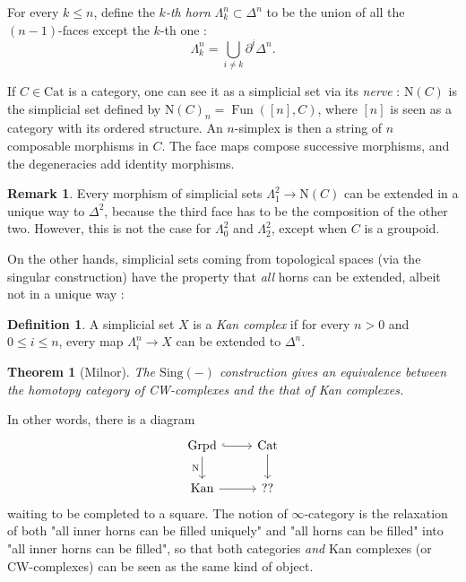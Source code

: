 \documentclass[11pt]{article}
\newtheorem{theorem}{Theorem}
\theoremstyle{definition}
\newtheorem{definition}{Definition}
\newtheorem{remark}{Remark}
\newcommand{\Grpd}{\mathrm{Grpd}}
\newcommand{\Cat}{\mathrm{Cat}}
\DeclareMathOperator{\Fun}{Fun}
\newcommand{\N}{\mathrm{N}}
\newcommand{\Kan}{\mathrm{Kan}}
\begin{document}
For every $k \leqslant n$, define the \emph{$k$-th horn} $\Lambda_k^n \subset \Delta^n$ to be the union of all the $(n-1)$-faces except the $k$-th one :
$$\Lambda_k^n = \bigcup_{i \neq k} \partial^i \Delta^n.$$

If $C \in \Cat$ is a category, one can see it as a simplicial set via its \emph{nerve} : $\N(C)$ is the simplicial set defined by $\N(C)_n = \Fun([n], C)$, where $[n]$ is seen as a category with its ordered structure. An $n$-simplex is then a string of $n$ composable morphisms in $C$. The face maps compose successive morphisms, and the degeneracies add identity morphisms.

\begin{remark}
    Every morphism of simplicial sets $\Lambda_1^2 \to \N(C)$ can be extended in a unique way to $\Delta^2$, because the third face has to be the composition of the other two. However, this is not the case for $\Lambda_0^2$ and $\Lambda_2^2$, except when $C$ is a groupoid.
\end{remark}

On the other hands, simplicial sets coming from topological spaces (via the singular construction) have the property that \emph{all} horns can be extended, albeit not in a unique way :

\begin{definition}
    A simplicial set $X$ is a \emph{Kan complex} if for every $n > 0$ and $0 \leqslant i \leqslant n$, every map $\Lambda_i^n \to X$ can be extended to $\Delta^n$.
\end{definition}

\begin{theorem}[Milnor]
    The $\mathrm{Sing}(-)$ construction gives an equivalence between the homotopy category of CW-complexes and the that of Kan complexes.
\end{theorem}

In other words, there is a diagram
\[\begin{tikzcd}
	\Grpd & \Cat \\
	\Kan & {??}
	\arrow[hook, from=1-1, to=1-2]
	\arrow["\N"', from=1-1, to=2-1]
	\arrow[from=1-2, to=2-2]
	\arrow[from=2-1, to=2-2]
\end{tikzcd}\]
waiting to be completed to a square. The notion of $\infty$-category is the relaxation of both "all inner horns can be filled uniquely" and "all horns can be filled" into "all inner horns can be filled", so that both categories \emph{and} Kan complexes (or CW-complexes) can be seen as the same kind of object.
\end{document}
